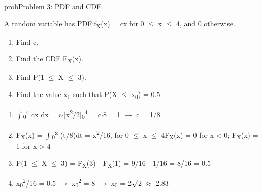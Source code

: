 \begin{PSbox}[unbreakable]{prob}{Problem 3: PDF and CDF}

A random variable has PDF:\PSbr{}f\textsubscript{X}(x) = cx for 0 \ensuremath{\le} x \ensuremath{\le} 4, and 0 otherwise.

\begin{enumerate}
\def\labelenumi{(\alph{enumi})}
\tightlist
\item
  Find c.
\item
  Find the CDF F\textsubscript{X}(x).
\item
  Find P(1 \ensuremath{\le} X \ensuremath{\le} 3).
\item
  Find the value x\textsubscript{0} such that P(X \ensuremath{\le} x\textsubscript{0}) = 0.5.
\end{enumerate}

\PSsolution{} 

\begin{enumerate}
\def\labelenumi{(\alph{enumi})}
\item
  \ensuremath{\int}\textsubscript{0}\textsuperscript{4} cx dx = c\ensuremath{\cdot}[x\textsuperscript{2}/2]\textsubscript{0}\textsuperscript{4} = c\ensuremath{\cdot}8 = 1 \ensuremath{\to} c = 1/8
\item
  F\textsubscript{X}(x) = \ensuremath{\int}\textsubscript{0}\textsuperscript{x} (t/8)dt = x\textsuperscript{2}/16, for 0 \ensuremath{\le} x \ensuremath{\le} 4\PSbr{}F\textsubscript{X}(x) = 0 for x \textless{} 0; F\textsubscript{X}(x) = 1 for x \textgreater{} 4
\item
  P(1 \ensuremath{\le} X \ensuremath{\le} 3) = F\textsubscript{X}(3) - F\textsubscript{X}(1) = 9/16 - 1/16 = 8/16 = 0.5
\item
  x\textsubscript{0}\textsuperscript{2}/16 = 0.5 \ensuremath{\to} x\textsubscript{0}\textsuperscript{2} = 8 \ensuremath{\to} x\textsubscript{0} = 2\ensuremath{\surd}2 \ensuremath{\approx} 2.83
\end{enumerate}

\end{PSbox}

